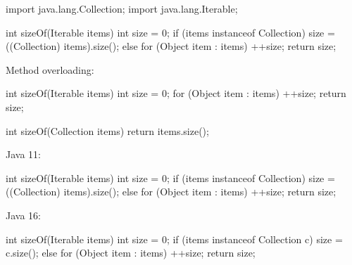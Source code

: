 \documentclass{article}
\begin{document}

\pptToc


\begin{pptWide}{2}
{\small\begin{ffcode}
import java.lang.Collection;
import java.lang.Iterable;

int sizeOf(Iterable items) {
  int size = 0;
  if (items instanceof Collection) {
    size = ((Collection) items).size();
  } else {
    for (Object item : items) {
      ++size;
    }
  }
  return size;
}
\end{ffcode}
}
\par\columnbreak\par
Method overloading:\par
{\small\begin{ffcode}
int sizeOf(Iterable items) {
  int size = 0;
  for (Object item : items) {
    ++size;
  }
  return size;
}

int sizeOf(Collection items) {
  return items.size();
}
\end{ffcode}
}
\end{pptWide}
\par
\plush{}

\begin{pptWide}{2}
Java 11:
\par
{\small\begin{ffcode}
int sizeOf(Iterable items) {
  int size = 0;
  if (items instanceof Collection) {
    size = ((Collection) items).size();
  } else {
    for (Object item : items) {
      ++size;
    }
  }
  return size;
}
\end{ffcode}
}
\par\columnbreak\par
Java 16:
\par
{\small\begin{ffcode}
int sizeOf(Iterable items) {
  int size = 0;
  if (items instanceof Collection c) {
    size = c.size();
  } else {
    for (Object item : items) {
      ++size;
    }
  }
  return size;
}
\end{ffcode}
}
\end{pptWide}
\par
\plush{}

\end{document}
